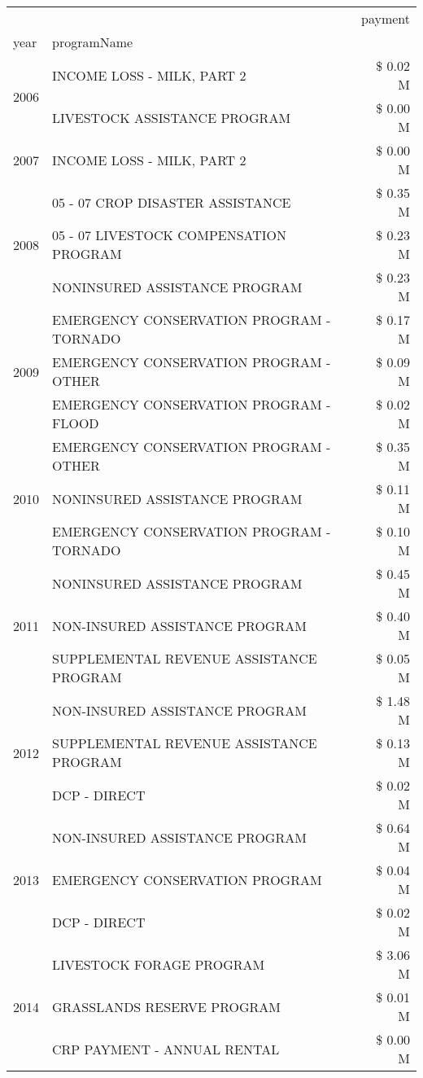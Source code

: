 \begin{tabular}{llr}
\toprule
 &  & payment \\
year & programName &  \\
\midrule
\multirow[t]{2}{*}{2006} & INCOME LOSS - MILK, PART 2 & \$ 0.02 M \\
 & LIVESTOCK ASSISTANCE PROGRAM & \$ 0.00 M \\
\cline{1-3}
2007 & INCOME LOSS - MILK, PART 2 & \$ 0.00 M \\
\cline{1-3}
\multirow[t]{3}{*}{2008} & 05 - 07 CROP DISASTER ASSISTANCE & \$ 0.35 M \\
 & 05 - 07 LIVESTOCK COMPENSATION PROGRAM & \$ 0.23 M \\
 & NONINSURED ASSISTANCE PROGRAM & \$ 0.23 M \\
\cline{1-3}
\multirow[t]{3}{*}{2009} & EMERGENCY CONSERVATION PROGRAM - TORNADO & \$ 0.17 M \\
 & EMERGENCY CONSERVATION PROGRAM - OTHER & \$ 0.09 M \\
 & EMERGENCY CONSERVATION PROGRAM - FLOOD & \$ 0.02 M \\
\cline{1-3}
\multirow[t]{3}{*}{2010} & EMERGENCY CONSERVATION PROGRAM - OTHER & \$ 0.35 M \\
 & NONINSURED ASSISTANCE PROGRAM & \$ 0.11 M \\
 & EMERGENCY CONSERVATION PROGRAM - TORNADO & \$ 0.10 M \\
\cline{1-3}
\multirow[t]{3}{*}{2011} & NONINSURED ASSISTANCE PROGRAM & \$ 0.45 M \\
 & NON-INSURED ASSISTANCE PROGRAM & \$ 0.40 M \\
 & SUPPLEMENTAL REVENUE ASSISTANCE PROGRAM & \$ 0.05 M \\
\cline{1-3}
\multirow[t]{3}{*}{2012} & NON-INSURED ASSISTANCE PROGRAM & \$ 1.48 M \\
 & SUPPLEMENTAL REVENUE ASSISTANCE PROGRAM & \$ 0.13 M \\
 & DCP - DIRECT & \$ 0.02 M \\
\cline{1-3}
\multirow[t]{3}{*}{2013} & NON-INSURED ASSISTANCE PROGRAM & \$ 0.64 M \\
 & EMERGENCY CONSERVATION PROGRAM & \$ 0.04 M \\
 & DCP - DIRECT & \$ 0.02 M \\
\cline{1-3}
\multirow[t]{3}{*}{2014} & LIVESTOCK FORAGE PROGRAM & \$ 3.06 M \\
 & GRASSLANDS RESERVE PROGRAM & \$ 0.01 M \\
 & CRP PAYMENT - ANNUAL RENTAL & \$ 0.00 M \\

\end{tabular}
